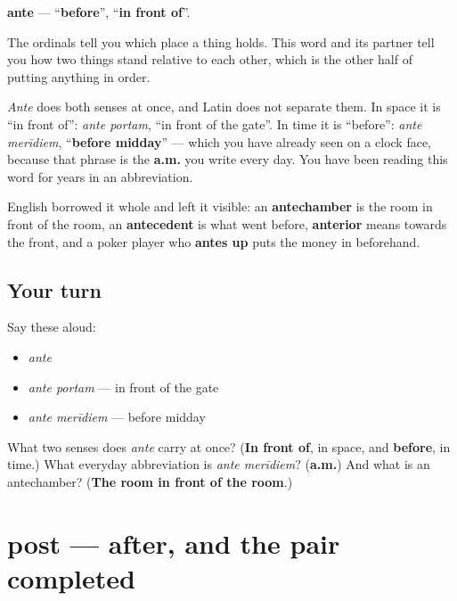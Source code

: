 \begin{cousinweb}
\textbf{ante} — \textquotedblleft{}\textbf{before}\textquotedblright{}, \textquotedblleft{}\textbf{in front of}\textquotedblright{}.

The ordinals tell you which place a thing holds. This word and its partner tell you how two things stand relative to each other, which is the other half of putting anything in order.

\emph{Ante} does both senses at once, and Latin does not separate them. In space it is \textquotedblleft{}in front of\textquotedblright{}: \emph{ante portam}, \textquotedblleft{}in front of the gate\textquotedblright{}. In time it is \textquotedblleft{}before\textquotedblright{}: \emph{ante merīdiem}, \textquotedblleft{}\textbf{before midday}\textquotedblright{} — which you have already seen on a clock face, because that phrase is the \textbf{a.m.} you write every day. You have been reading this word for years in an abbreviation.

English borrowed it whole and left it visible: an \textbf{antechamber} is the room in front of the room, an \textbf{antecedent} is what went before, \textbf{anterior} means towards the front, and a poker player who \textbf{antes up} puts the money in beforehand.
\end{cousinweb}

\subsection*{Your turn}
Say these aloud:

\begin{itemize}
\raggedright
  \item \emph{ante}
  \item \emph{ante portam} — in front of the gate
  \item \emph{ante merīdiem} — before midday
\end{itemize}

\begin{tcolorbox}[breakable,colback=teal!4,colframe=teal!35!black,title={Before you move on}]
What two senses does \emph{ante} carry at once? (\textbf{In front of}, in space, and \textbf{before}, in time.) What everyday abbreviation is \emph{ante merīdiem}? (\textbf{a.m.}) And what is an antechamber? (\textbf{The room in front of the room}.)
\end{tcolorbox}
\section[post]{post — after, and the pair completed}


